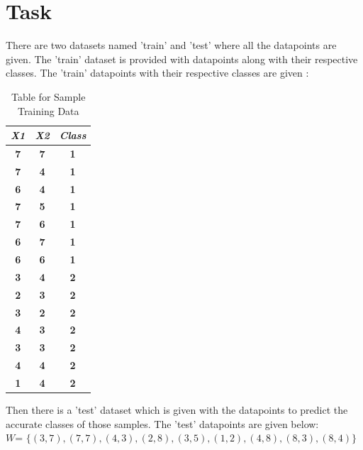 \documentclass[conference]{IEEEtran}
\begin{document}
\section{Task}

There are two datasets named 'train' and 'test' where all the datapoints are given. The 'train' dataset is provided with datapoints along with their respective classes. The 'train' datapoints with their respective classes are given :\\
\begin{table}[htbp]
\caption{Table for Sample Training Data}
\begin{center}
\begin{tabular}{|c|c|c|}
\hline
\textbf{\textit{X1}}&\textbf{\textit{X2}}& \textbf{\textit{Class}} \\
\hline
\textbf{{7}}&\textbf{{7}}&   \textbf{{1}} \\
\hline
\textbf{{7}}&\textbf{{4}}&   \textbf{{1}} \\
\hline
\textbf{{6}}&\textbf{{4}}&   \textbf{{1}} \\
\hline
\textbf{{7}}&\textbf{{5}}&   \textbf{{1}} \\
\hline
\textbf{{7}}&\textbf{{6}}&   \textbf{{1}} \\
\hline
\textbf{{6}}&\textbf{{7}}&   \textbf{{1}} \\
\hline
\textbf{{6}}&\textbf{{6}}&   \textbf{{1}} \\
\hline
\textbf{{3}}&\textbf{{4}}&   \textbf{{2}} \\
\hline
\textbf{{2}}&\textbf{{3}}&   \textbf{{2}} \\
\hline
\textbf{{3}}&\textbf{{2}}&   \textbf{{2}} \\
\hline
\textbf{{4}}&\textbf{{3}}&   \textbf{{2}} \\
\hline
\textbf{{3}}&\textbf{{3}}&   \textbf{{2}} \\
\hline
\textbf{{4}}&\textbf{{4}}&   \textbf{{2}} \\
\hline
\textbf{{1}}&\textbf{{4}}&   \textbf{{2}} \\
\hline
\end{tabular}
\label{tab1}
\end{center}
\end{table}

Then there is a 'test' dataset which is given with the datapoints to predict the accurate classes of those samples. The 'test' datapoints are given below:\\
$W$= $\{(3,7),(7,7),(4,3),(2,8),(3,5),(1,2),(4,8),(8,3),(8,4)\}$\\
\end{document}
